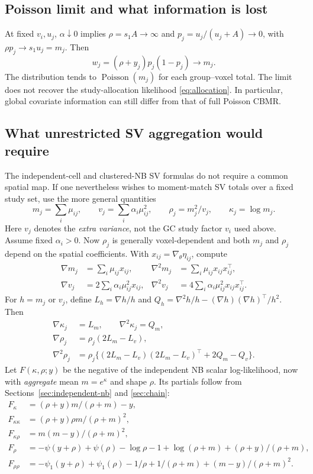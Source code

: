 \documentclass[11pt,a4paper]{article}
\numberwithin{equation}{section}
\begin{document}
\subsection{Poisson limit and what information is lost}
At fixed $v_i,u_j$, $\alpha\downarrow0$ implies $\rho=s_1A\to\infty$
and $p_j=u_j/(u_j+A)\to0$, with
$\rho p_j\to s_1u_j=m_j$.
Then
\[
 w_j=(\rho+y_j)p_j(1-p_j)\longrightarrow m_j .
\]
The distribution tends to $\operatorname{Poisson}(m_j)$ for each
group--voxel total. The limit does not recover the study-allocation
likelihood \eqref{eq:allocation}. In particular, global covariate
information can still differ from that of full Poisson CBMR.

\subsection{What unrestricted SV aggregation would require}
The independent-cell and clustered-NB SV formulas do not require a
common spatial map. If one nevertheless wishes to moment-match SV
totals over a fixed study set, use the more general quantities
\[
 m_j=\sum_i\mu_{ij},\qquad
 v_j=\sum_i\alpha_i\mu_{ij}^2,\qquad
 \rho_j=m_j^2/v_j,\qquad \kappa_j=\log m_j .
\]
Here $v_j$ denotes the \emph{extra variance}, not the GC study factor
$v_i$ used above. Assume fixed $\alpha_i>0$.
Now $\rho_j$ is generally voxel-dependent and both $m_j$ and
$\rho_j$ depend on the spatial coefficients.
With $x_{ij}=\nabla_\theta\eta_{ij}$, compute
\begin{align}
 \nabla m_j&=\sum_i\mu_{ij}x_{ij},&
 \nabla^2m_j&=\sum_i\mu_{ij}x_{ij}x_{ij}^\top,\\
 \nabla v_j&=2\sum_i\alpha_i\mu_{ij}^2x_{ij},&
 \nabla^2v_j&=4\sum_i\alpha_i\mu_{ij}^2x_{ij}x_{ij}^\top .
\end{align}
For $h=m_j$ or $v_j$, define
$L_h=\nabla h/h$ and
$Q_h=\nabla^2h/h-(\nabla h)(\nabla h)^\top/h^2$.
Then
\begin{align}
 \nabla\kappa_j&=L_m,\qquad \nabla^2\kappa_j=Q_m,\\
 \nabla\rho_j&=\rho_j(2L_m-L_v),\\
 \nabla^2\rho_j&=\rho_j\{(2L_m-L_v)(2L_m-L_v)^\top+2Q_m-Q_v\}.
\end{align}
Let $F(\kappa,\rho;y)$ be the negative of the independent NB scalar
log-likelihood, now with \emph{aggregate} mean $m=e^\kappa$
and shape $\rho$. Its partials follow from
Sections~\ref{sec:independent-nb} and \ref{sec:chain}:
\begin{align}
 F_\kappa&=(\rho+y)m/(\rho+m)-y,\\
 F_{\kappa\kappa}&=(\rho+y)\rho m/(\rho+m)^2,\\
 F_{\kappa\rho}&=m(m-y)/(\rho+m)^2,\\
 F_\rho&=-\psi(y+\rho)+\psi(\rho)-\log\rho-1
                   +\log(\rho+m)+(\rho+y)/(\rho+m),\\
 F_{\rho\rho}&=-\psi_1(y+\rho)+\psi_1(\rho)-1/\rho
                         +1/(\rho+m)+(m-y)/(\rho+m)^2.
\end{align}
\end{document}
